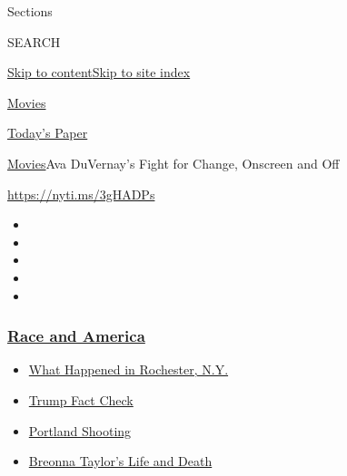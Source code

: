 Sections

SEARCH

\protect\hyperlink{site-content}{Skip to
content}\protect\hyperlink{site-index}{Skip to site index}

\href{https://www.nytimes3xbfgragh.onion/section/movies}{Movies}

\href{https://myaccount.nytimes3xbfgragh.onion/auth/login?response_type=cookie\&client_id=vi}{}

\href{https://www.nytimes3xbfgragh.onion/section/todayspaper}{Today's
Paper}

\href{/section/movies}{Movies}\textbar{}Ava DuVernay's Fight for Change,
Onscreen and Off

\url{https://nyti.ms/3gHADPs}

\begin{itemize}
\item
\item
\item
\item
\item
\end{itemize}

\hypertarget{race-and-america}{%
\subsubsection{\texorpdfstring{\href{https://www.nytimes3xbfgragh.onion/news-event/george-floyd-protests-minneapolis-new-york-los-angeles?name=styln-george-floyd\&region=TOP_BANNER\&block=storyline_menu_recirc\&action=click\&pgtype=Article\&impression_id=87479410-f2bc-11ea-9844-b5eaae65ed1c\&variant=undefined}{Race
and America}}{Race and America}}\label{race-and-america}}

\begin{itemize}
\tightlist
\item
  \href{https://www.nytimes3xbfgragh.onion/2020/09/04/nyregion/rochester-police-daniel-prude.html?name=styln-george-floyd\&region=TOP_BANNER\&block=storyline_menu_recirc\&action=click\&pgtype=Article\&impression_id=87479411-f2bc-11ea-9844-b5eaae65ed1c\&variant=undefined}{What
  Happened in Rochester, N.Y.}
\item
  \href{https://www.nytimes3xbfgragh.onion/2020/09/01/us/politics/trump-fact-check-protests.html?name=styln-george-floyd\&region=TOP_BANNER\&block=storyline_menu_recirc\&action=click\&pgtype=Article\&impression_id=87479412-f2bc-11ea-9844-b5eaae65ed1c\&variant=undefined}{Trump
  Fact Check}
\item
  \href{https://www.nytimes3xbfgragh.onion/2020/08/30/us/portland-shooting-explained.html?name=styln-george-floyd\&region=TOP_BANNER\&block=storyline_menu_recirc\&action=click\&pgtype=Article\&impression_id=8747bb20-f2bc-11ea-9844-b5eaae65ed1c\&variant=undefined}{Portland
  Shooting}
\item
  \href{https://www.nytimes3xbfgragh.onion/2020/08/30/us/breonna-taylor-police-killing.html?name=styln-george-floyd\&region=TOP_BANNER\&block=storyline_menu_recirc\&action=click\&pgtype=Article\&impression_id=8747bb21-f2bc-11ea-9844-b5eaae65ed1c\&variant=undefined}{Breonna
  Taylor's Life and Death}
\end{itemize}

